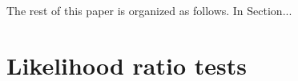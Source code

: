 \documentclass[12pt]{article}
\numberwithin{equation}{section}
\theoremstyle{plain}
\begin{document}
%

The rest of this paper is organized as follows. In Section...




\section{Likelihood ratio tests}
\label{sec:likelihood-ratio-tests}
\end{document}

